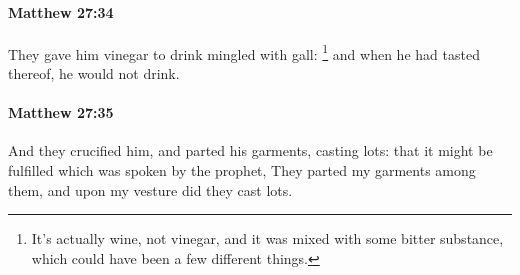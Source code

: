 		\paragraph{Matthew 27:34} %
			\label{MATTHEW-27-34}

			They gave him vinegar to drink mingled with gall:%
				\footnote{%
					It's actually wine, not vinegar, and it was mixed with some bitter substance, which could have been a few different things.
					} 
			and when he had tasted thereof, he would not drink.

			\begin{framed}
			\scriptsize
				\begin{compactdesc}
					\item[SBLG] 
				\end{compactdesc}
			\end{framed}

		\paragraph{Matthew 27:35} %
			\label{MATTHEW-27-35}

			And they crucified him, and parted his garments, casting lots: that it might be fulfilled which was spoken by the prophet, They parted my garments among them, and upon my vesture did they cast lots.

